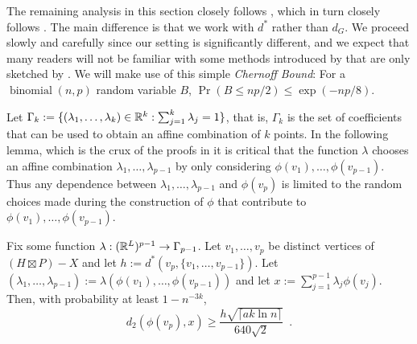 \documentclass{patmorin}
\renewcommand{\ge}{\geqslant}
\renewcommand{\le}{\leqslant}
\newcommand{\defin}[1]{\emph{\textcolor{brightmaroon}{#1}}}
\begin{document}
The remaining analysis in this section closely follows \citet{rao:small}, which in turn closely follows \citet{feige:approximating}.  The main difference is that we work with $d^*$ rather than $d_G$.  We proceed slowly and carefully since our setting is significantly different, and we expect that many readers will not be familiar with some methods introduced by \citet{feige:approximating} that are only sketched by \citet{rao:small}. We will make use of this simple \defin{Chernoff Bound}:  For a $\operatorname{binomial}(n,p)$ random variable $B$, $\Pr(B \le np/2) \le \exp(-np/8)$.

Let $\Gamma_k:=\{(\lambda_1,\ldots,\lambda_k)\in \mathbb{R}^k:\sum_{j=1}^k\lambda_j=1\}$, that is, $\Gamma_k$ is the set of coefficients that can be used to obtain an affine combination of $k$ points.  In the following lemma, which is the crux of the proofs in \cite{rao:small,feige:approximating} it is critical that the function $\lambda$ chooses an affine combination $\lambda_1,\ldots,\lambda_{p-1}$ by only considering $\phi(v_1),\ldots,\phi(v_{p-1})$.  Thus any dependence between $\lambda_1,\ldots,\lambda_{p-1}$ and $\phi(v_p)$ is limited to the random choices made during the construction of $\phi$ that contribute to $\phi(v_1),\ldots,\phi(v_{p-1})$.


\begin{lem}\label{crux}
  Fix some function $\lambda:(\mathbb{R}^{L})^{p-1}\to \Gamma_{p-1}$.
  Let $v_1,\ldots,v_p$ be distinct vertices of $(H\boxtimes P)-X$ and let $h:=d^*(v_p,\{v_1,\ldots,v_{p-1}\})$.  Let $(\lambda_1,\ldots,\lambda_{p-1}):=\lambda(\phi(v_1),\ldots,\phi(v_{p-1}))$ and let $x:=\sum_{j=1}^{p-1}\lambda_j\phi(v_j)$.
  Then, with probability at least $1-n^{-3k}$,
  \[
    d_2(\phi(v_p),x)\ge \frac{h\sqrt{\lceil ak\ln n\rceil}}{640\sqrt{2}} \enspace .
  \]
\end{lem}
\end{document}
